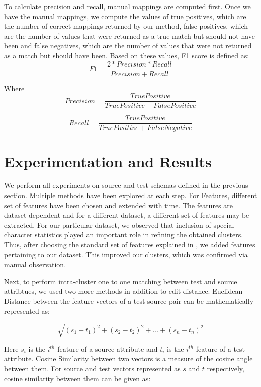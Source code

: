 \documentclass[conference]{IEEEtran}
\begin{document}
To calculate precision and recall, manual mappings are computed first. Once we have the manual mappings, we compute the values of true positives, which are the number of correct mappings returned by our method, false positives, which are the number of values that were returned as a true match but should not have been and false negatives, which are the number of values that were not returned as a match but should have been. Based on these values, F1 score is defined as: 
\begin{equation}
F1 = \frac{2 * Precision * Recall}{Precision + Recall}
\end{equation}

\noindent
Where
\begin{equation}
Precision = \frac{True Positive}{True Positive + False Positive}
\end{equation}

\begin{equation}
Recall = \frac{True Positive}{True Positive + False Negative}
\end{equation}
    
\section{Experimentation and Results}
We perform all experiments on source and test schemas defined in the previous section. Multiple methods have been explored at each step. For Features, different set of features have been chosen and extended with time. The features are dataset dependent and for a different dataset, a different set of features may be extracted. For our particular dataset, we observed that inclusion of special character statistics played an important role in refining the obtained clusters. Thus, after choosing the standard set of features explained in \cite{ref1}, we added features pertaining to our dataset. This improved our clusters, which was confirmed via manual observation. 

Next, to perform intra-cluster one to one matching between test and source attribtues, we used two more methods in addition to edit distance. Euclidean Distance between the feature vectors of a test-source pair can be mathematically represented as:

\begin{equation}
\sqrt{(s_1-t_1)^2 + (s_2-t_2)^2 + ... + (s_n-t_n)^2}
\end{equation}

Here $s_i$ is the $i^{th}$ feature of a source attribute and $t_i$ is the $i^{th}$ feature of a test attribute. Cosine Similarity between two vectors is a measure of the cosine angle between them. For source and test vectors represented as $s$ and $t$ respectively, cosine similarity between them can be given as: 
\end{document}
